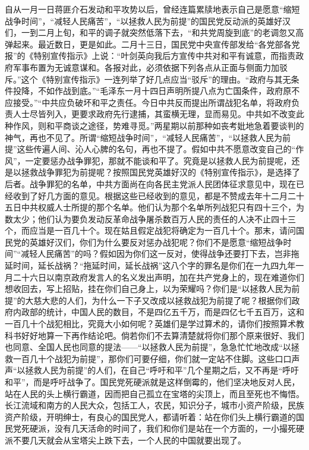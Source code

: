 \documentclass[cn,11pt,chinese]{elegantbook}
\begin{document}
自从一月一日蒋匪介石发动和平攻势以后，曾经连篇累牍地表示自己是愿意“缩短战争时间”，“减轻人民痛苦”，“以拯救人民为前提”的国民党反动派的英雄好汉们，一到二月上旬，和平的调子就突然低落下去，“和共党周旋到底”的老调忽又高弹起来。最近数日，更是如此。二月十三日，国民党中央宣传部发给“各党部各党报”的《特别宣传指示》上说：“叶剑英向我后方宣传中共对和平有诚意，而指责政府军事布置为无诚意谋和。各报对此，必须依据下列各点从正面与侧面力加驳斥。”这个《特别宣传指示》一连列举了好几点应当“驳斥”的理由。“政府与其无条件投降，不如作战到底。”“毛泽东一月十四日声明所提八点为亡国条件，政府原不应接受。”“中共应负破坏和平之责任。今日中共反而提出所谓战犯名单，将政府负责人士尽皆列入，更要求政府先行逮捕，其蛮横无理，显而易见。中共如不改变此种作风，则和平商谈之途径，势难寻觅。”两星期以前那种如丧考妣地急着要谈判的神气，再也不见了。所谓“缩短战争时间”，“减轻人民痛苦”，“以拯救人民为前提”这些传遍人间、沁人心脾的名句，再也不提了。假如中共不愿意改变自己的“作风”，一定要惩办战争罪犯，那就不能谈和平了。究竟是以拯救人民为前提呢，还是以拯救战争罪犯为前提呢？按照国民党英雄好汉的《特别宣传指示》，是选择了后者。战争罪犯的名单，中共方面尚在向各民主党派人民团体征求意见中，现在已经收到了好几方面的意见。根据这些已经收到的意见，都是不赞成去年十二月二十五日中共权威人士所提的那个名单。他们认为那个名单所列战犯只有四十三个，为数太少；他们认为要负发动反革命战争屠杀数百万人民的责任的人决不止四十三个，而应当是一百几十个。现在姑且假定战犯将确定为一百几十个。那末，请问国民党的英雄好汉们，你们为什么要反对惩办战犯呢？你们不是愿意“缩短战争时间”“减轻人民痛苦”的吗？假如因为你们这一反对，使得战争还要打下去，岂非拖延时间，延长战祸？“拖延时间，延长战祸”这八个字的罪名是你们在一九四九年一月二十六日以南京政府发言人的名义发出声明，加在共产党身上的，现在难道你们想收回去，写上招贴，挂在你们自己身上，以为荣耀吗？你们是“以拯救人民为前提”的大慈大悲的人们，为什么一下子又改成以拯救战犯为前提了呢？根据你们政府内政部的统计，中国人民的数目，不是四亿五千万，而是四亿七千五百万，这和一百几十个战犯相比，究竟大小如何呢？英雄们是学过算术的，请你们按照算术教科书好好地算一下再作结论吧。倘若你们不去算清楚就将你们那个原来很好、我们也同意、全国人民也同意的提法——“以拯救人民为前提”，急急忙忙地改成“以拯救一百几十个战犯为前提”，那你们可要仔细，你们就一定站不住脚。这些口口声声“以拯救人民为前提”的人们，在自己“呼吁和平”几个星期之后，又不再是“呼吁和平”，而是呼吁战争了。国民党死硬派就是这样倒霉的，他们坚决地反对人民，站在人民的头上横行霸道，因而把自己孤立在宝塔的尖顶上，而且至死也不悔悟。长江流域和南方的人民大众，包括工人，农民，知识分子，城市小资产阶级，民族资产阶级，开明绅士，有良心的国民党人，都请听着：站在你们头上横行霸道的国民党死硬派，没有几天活命的时间了，我们和你们是站在一个方面的，一小撮死硬派不要几天就会从宝塔尖上跌下去，一个人民的中国就要出现了。\\
\end{document}
